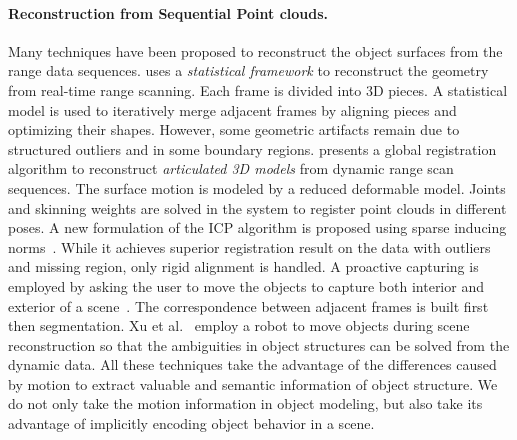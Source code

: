%

\paragraph{Reconstruction from Sequential Point clouds.}

Many techniques have been proposed to reconstruct the object surfaces from the range data sequences.
\cite{Wand2007} uses a \emph{statistical framework} to reconstruct the geometry from real-time range scanning.
Each frame is divided into 3{D} pieces. A statistical model is used to iteratively merge adjacent frames by aligning pieces and optimizing their shapes.
However, some geometric artifacts remain due to structured outliers and in some boundary regions.
\cite{chang11global} presents a global registration algorithm to reconstruct \emph{articulated 3D models} from dynamic range scan sequences.
The surface motion is modeled by a reduced deformable model.
Joints and skinning weights are solved in the system to register point clouds in different poses.
%
A new formulation of the ICP algorithm is proposed using sparse inducing norms~\cite{sparseicp_sgp13}.
While it achieves superior registration result on the data with outliers and missing region, only rigid alignment is handled.
%
A proactive capturing is employed by asking the user to move the objects to capture both interior and exterior of a scene~\cite{YanSiggraph14}. The correspondence between adjacent frames is built first then segmentation. 
Xu et al.~ employ a robot to move objects during scene reconstruction so that the ambiguities in object structures can be solved from the dynamic data.
%
All these techniques take the advantage of the differences caused by motion to extract valuable and semantic information of object structure.
We do not only take the motion information in object modeling, but also take its advantage of implicitly encoding object behavior in a scene. 

